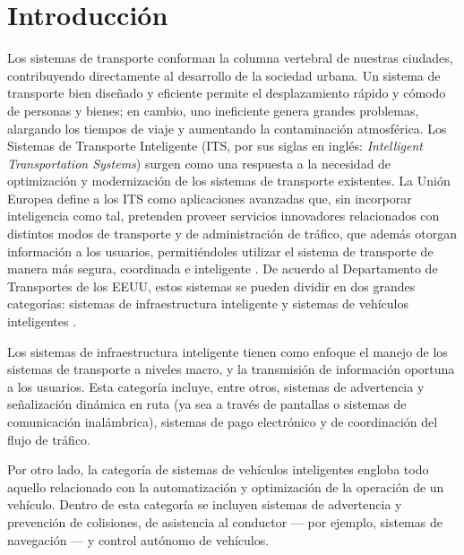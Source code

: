 \chapter{Introducción}
Los sistemas de transporte conforman la columna vertebral de nuestras ciudades, contribuyendo directamente al desarrollo de la sociedad urbana. Un sistema de transporte bien diseñado y eficiente permite el desplazamiento rápido y cómodo de personas y bienes; en cambio, uno ineficiente genera grandes problemas, alargando los tiempos de viaje y aumentando la contaminación atmosférica.
Los Sistemas de Transporte Inteligente (ITS, por sus siglas en inglés: \textit{Intelligent Transportation Systems}) surgen como una respuesta a la necesidad de optimización y modernización de los sistemas de transporte existentes. La Unión Europea define a los ITS como aplicaciones avanzadas que, sin incorporar inteligencia como tal, pretenden proveer servicios innovadores relacionados con distintos modos de transporte y de administración de tráfico, que además otorgan información a los usuarios, permitiéndoles utilizar el sistema de transporte de manera más segura, coordinada e inteligente \cite{eudirective}. De acuerdo al Departamento de Transportes de los EEUU, estos sistemas se pueden dividir en dos grandes categorías: sistemas de infraestructura inteligente y sistemas de vehículos inteligentes \cite{usdot}.

Los sistemas de infraestructura inteligente tienen como enfoque el manejo de los sistemas de transporte a niveles macro, y la transmisión de información oportuna a los usuarios. Esta categoría incluye, entre otros, sistemas de advertencia y señalización dinámica en ruta (ya sea a través de pantallas o sistemas de comunicación inalámbrica), sistemas de pago electrónico y de coordinación del flujo de tráfico.

Por otro lado, la categoría de sistemas de vehículos inteligentes engloba todo aquello relacionado con la automatización y optimización de la operación de un vehículo. Dentro de esta categoría se incluyen sistemas de advertencia y prevención de colisiones, de asistencia al conductor --- por ejemplo, sistemas de navegación --- y control autónomo de vehículos.

